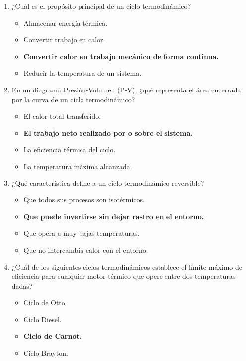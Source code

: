 \documentclass{article}
\begin{document}
\begin{enumerate}[label=\arabic*.]

    \item ¿Cuál es el propósito principal de un ciclo termodinámico?
    \begin{itemize}[label=\alph*)]
        \item Almacenar energía térmica.
        \item Convertir trabajo en calor.
        \item \textbf{Convertir calor en trabajo mecánico de forma continua.}
        \item Reducir la temperatura de un sistema.
    \end{itemize}

    \item En un diagrama Presión-Volumen (P-V), ¿qué representa el área encerrada por la curva de un ciclo termodinámico?
    \begin{itemize}[label=\alph*)]
        \item El calor total transferido.
        \item \textbf{El trabajo neto realizado por o sobre el sistema.}
        \item La eficiencia térmica del ciclo.
        \item La temperatura máxima alcanzada.
    \end{itemize}

    \item ¿Qué característica define a un ciclo termodinámico reversible?
    \begin{itemize}[label=\alph*)]
        \item Que todos sus procesos son isotérmicos.
        \item \textbf{Que puede invertirse sin dejar rastro en el entorno.}
        \item Que opera a muy bajas temperaturas.
        \item Que no intercambia calor con el entorno.
    \end{itemize}

    \item ¿Cuál de los siguientes ciclos termodinámicos establece el límite máximo de eficiencia para cualquier motor térmico que opere entre dos temperaturas dadas?
    \begin{itemize}[label=\alph*)]
        \item Ciclo de Otto.
        \item Ciclo Diesel.
        \item \textbf{Ciclo de Carnot.}
        \item Ciclo Brayton.
    \end{itemize}


\end{enumerate}
\end{document}
